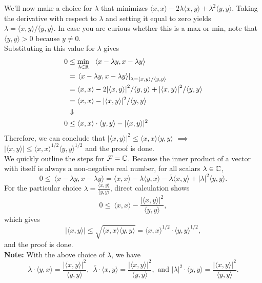 We'll now make a choice for $\lambda$ that minimizes $\langle x, x\rangle - 2\lambda\langle x, y\rangle + \lambda^2\langle y,y\rangle$. Taking the derivative with respect to $\lambda$ and setting it equal to zero yields $\lambda = \langle x, y \rangle/\langle y, y \rangle$. In case you are curious whether this is a max or min, note that $\langle y, y \rangle >0$ because $y \neq 0$.\\

Substituting in this value for $\lambda$ gives
    \begin{align*}
        0& \le \min \limits_{\lambda \in \mathbb R}~~{\langle x-\lambda y, x-\lambda y\rangle} \\
        & = \left. \langle x- \lambda y, x- \lambda y \rangle \right|_{ \lambda = \langle x, y \rangle/ \langle y, y \rangle } \\
        &=\langle x,x\rangle - 2{|\langle x, y\rangle|}^2/\langle y,y \rangle + {|\langle x, y \rangle|}^2/{\langle y, y\rangle}\\
        &=\langle x,x\rangle - |\langle x,y\rangle|^2/\langle y, y\rangle \\
        & \Downarrow \\
      0  &\le  \langle x,x\rangle \cdot \langle y, y\rangle -|\langle x,y\rangle|^2
    \end{align*}
    Therefore, we can conclude that $|\langle x,y\rangle|^2\leq\langle x,x\rangle\langle y,y\rangle$ $\implies$ $|\langle x,y\rangle|\leq\langle x,x\rangle^{1/2}\langle y,y\rangle^{1/2}$ and the proof is done.\\

We quickly outline the steps for $\mathcal{F}=\mathbb C$. Because the inner product of a vector with itself is always a non-negative real number, for all scalars $\lambda \in \mathbb C$,
$$0 \le ~ \langle x-\lambda y, x-\lambda y \rangle   = \langle x,x \rangle   - \lambda \langle  y, x \rangle   - \overline{\lambda} \langle  x, y \rangle   + |\lambda|^2 \langle y,y \rangle  .$$
 For the particular choice $\lambda = \frac{\langle x, y \rangle  }{\langle y,y \rangle  }$, direct calculation shows
$$0 \le~ \langle x,x \rangle   - \frac{|\langle x,y \rangle  |^2}{\langle y,y \rangle  }, $$
which gives
$$|\langle x,y \rangle  | \le \sqrt{\langle x,x \rangle   \langle y,y \rangle  } = \langle x,x \rangle  ^{1/2} \cdot \langle y,y \rangle  ^{1/2},$$ 
and the proof is done. \\

\textbf{Note:} With the above choice of $\lambda$, we have 
$$\lambda \cdot \langle  y, x \rangle   = \frac{|\langle x,y \rangle  |^2}{\langle y,y \rangle  },~~  \overline{\lambda} \cdot \langle  x, y \rangle   =  \frac{|\langle x,y \rangle  |^2}{\langle y,y \rangle  }, \text{ and } |\lambda|^2 \cdot \langle y,y \rangle   =\frac{|\langle x,y \rangle  |^2}{\langle y,y \rangle  }. $$
    
